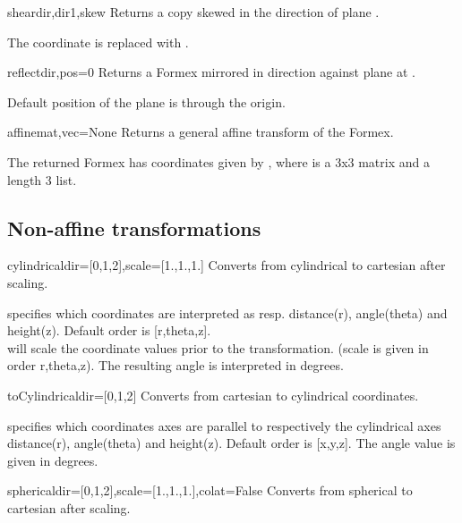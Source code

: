 {{\begin{methoddesc}{shear}{dir,dir1,skew}
Returns a copy skewed in the direction  of plane .

The coordinate  is replaced with .
\end{methoddesc}

\begin{methoddesc}{reflect}{dir,pos=0}
Returns a Formex mirrored in direction  against plane at .

Default position of the plane is through the origin.
\end{methoddesc}

\begin{methoddesc}{affine}{mat,vec=None}
Returns a general affine transform of the Formex.

The returned Formex has coordinates given by , where  is a 3x3 matrix and  a length 3 list.
\end{methoddesc}


\subsection{Non-affine transformations}

\begin{methoddesc}{cylindrical}{dir=[0,1,2],scale=[1.,1.,1.]}
Converts from cylindrical to cartesian after scaling.

 specifies which coordinates are interpreted as resp. distance(r), angle(theta) and height(z). Default order is [r,theta,z].\\
 will scale the coordinate values prior to the transformation. (scale is given in order r,theta,z). The resulting angle is interpreted in degrees.
\end{methoddesc}


\begin{methoddesc}{toCylindrical}{dir=[0,1,2]}
Converts from cartesian to cylindrical coordinates.

 specifies which coordinates axes are parallel to respectively the cylindrical axes distance(r), angle(theta) and height(z). Default order is [x,y,z]. The angle value is given in degrees.
\end{methoddesc}

\begin{methoddesc}{spherical}{dir=[0,1,2],scale=[1.,1.,1.],colat=False}
Converts from spherical to cartesian after scaling.


\end{methoddesc}}}
